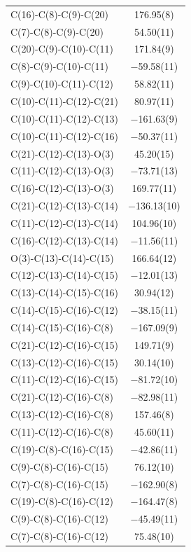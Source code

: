 \begin{center}
{\begin{supertabular}{p{1.5in}c}
C(16)-C(8)-C(9)-C(20)&176.95(8)\\
C(7)-C(8)-C(9)-C(20)&54.50(11)\\
C(20)-C(9)-C(10)-C(11)&171.84(9)\\
C(8)-C(9)-C(10)-C(11)&$-$59.58(11)\\
C(9)-C(10)-C(11)-C(12)&58.82(11)\\
C(10)-C(11)-C(12)-C(21)&80.97(11)\\
C(10)-C(11)-C(12)-C(13)&$-$161.63(9)\\
C(10)-C(11)-C(12)-C(16)&$-$50.37(11)\\
C(21)-C(12)-C(13)-O(3)&45.20(15)\\
C(11)-C(12)-C(13)-O(3)&$-$73.71(13)\\
C(16)-C(12)-C(13)-O(3)&169.77(11)\\
C(21)-C(12)-C(13)-C(14)&$-$136.13(10)\\
C(11)-C(12)-C(13)-C(14)&104.96(10)\\
C(16)-C(12)-C(13)-C(14)&$-$11.56(11)\\
O(3)-C(13)-C(14)-C(15)&166.64(12)\\
C(12)-C(13)-C(14)-C(15)&$-$12.01(13)\\
C(13)-C(14)-C(15)-C(16)&30.94(12)\\
C(14)-C(15)-C(16)-C(12)&$-$38.15(11)\\
C(14)-C(15)-C(16)-C(8)&$-$167.09(9)\\
C(21)-C(12)-C(16)-C(15)&149.71(9)\\
C(13)-C(12)-C(16)-C(15)&30.14(10)\\
C(11)-C(12)-C(16)-C(15)&$-$81.72(10)\\
C(21)-C(12)-C(16)-C(8)&$-$82.98(11)\\
C(13)-C(12)-C(16)-C(8)&157.46(8)\\
C(11)-C(12)-C(16)-C(8)&45.60(11)\\
C(19)-C(8)-C(16)-C(15)&$-$42.86(11)\\
C(9)-C(8)-C(16)-C(15)&76.12(10)\\
C(7)-C(8)-C(16)-C(15)&$-$162.90(8)\\
C(19)-C(8)-C(16)-C(12)&$-$164.47(8)\\
C(9)-C(8)-C(16)-C(12)&$-$45.49(11)\\
C(7)-C(8)-C(16)-C(12)&75.48(10)\\
\end{supertabular}
}
\end{center}

